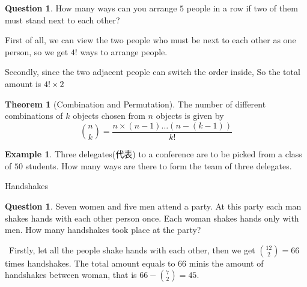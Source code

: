 \documentclass{beamer}
\theoremstyle{definition}
\newtheorem{theo}[defn]{Theorem}
\newtheorem{exam}[defn]{Example}
\newtheorem{ques}[defn]{Question}
\newenvironment{prooff}{{\noindent\it\textcolor{cyan!40!black}{Proof}:}\,}{\par}
\begin{document}
\begin{frame}
    \begin{ques}
        How many ways can you arrange $5$ people in a row if two of them must stand next to each other?
    \end{ques}
    \pause
    First of all, we can view the two people who must be next to each other as one person, so we get $4!$ ways to arrange people.

    Secondly, since the two adjacent people can switch the order inside,
    So the total amount is $4!\times 2$
\end{frame}
\begin{frame}
    \begin{theo}[Combination and Permutation]
        The number of different combinations of $k$ objects chosen from $n$ objects is given by
        \begin{equation*}
            \binom{n}{k}=\frac{n\times (n-1)\dots (n-(k-1))}{k!}
        \end{equation*}
    \end{theo}
    \begin{exam}
        Three delegates(代表) to a conference are to be picked from a class of $50$ students. How many ways are there
        to form the team of three delegates.
    \end{exam}
\end{frame}
\begin{frame}{Handshakes}
    \begin{ques}
        Seven women and five men attend a party. At this party each man shakes hands with each other person once. Each woman shakes hands only with men.
        How many handshakes took place at the party?
    \end{ques}
    \pause
    \begin{prooff}
        Firstly, let all the people shake hands with each other, then we get $\binom{12}{2}=66$ times handshakes.
        The total amount equals to $66$ minis the amount of handshakes between woman, that is $66-\binom{7}{2}=45$.
    \end{prooff}
\end{frame}
\end{document}

